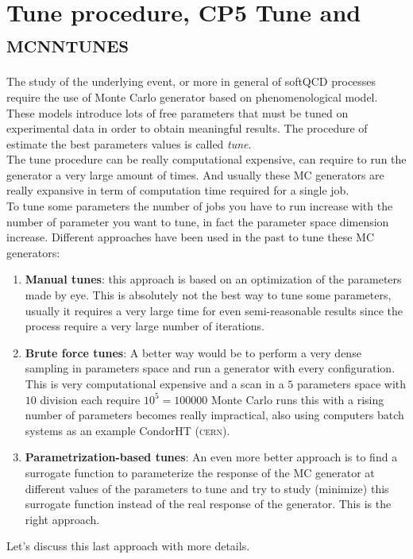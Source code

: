 \chapter{Tune procedure, CP5 Tune and \textsc{mcnntunes}}
\label{chap:TuneprocedureCP5TuneandMCNNTUNES}

The study of the underlying event, or more in general of softQCD processes require the use of Monte Carlo generator based on phenomenological model. These models introduce lots of free parameters that must be tuned on experimental data in order to obtain meaningful results. The procedure of estimate the best parameters values is called \textit{tune}. 
\\
The tune procedure can be really computational expensive,  can require to run the generator a very large amount of times. And usually these MC generators are really expansive in term of computation time required for a single job. 
\\
To tune some parameters the number of jobs you have to run increase with the number of parameter you want to tune, in fact the parameter space dimension increase. Different approaches have been used in the past to tune these MC generators:
\begin{enumerate}[label=\arabic*)]
	\item \textbf{Manual tunes}: this approach is based on an optimization of the parameters made by eye. This is absolutely not the best way to tune some parameters, usually it requires a very large time for even semi-reasonable results since the process require a very large number of iterations.   
	\item \textbf{Brute force tunes}: A better way would be to perform a very dense sampling in parameters space and run a generator with every configuration. This is very computational expensive and a scan in a $5$ parameters space with $10$ division each require $10^5=100000$ Monte Carlo runs this with a rising number of parameters becomes really impractical, also using computers batch systems as an example CondorHT (\textsc{cern}).   
	\item \textbf{Parametrization-based tunes}: An even more better approach is to find a surrogate function to parameterize the response of the MC generator at different values of the parameters to tune and try to study (minimize) this surrogate function instead of the real response of the generator. This is the right approach.
\end{enumerate}
Let's discuss this last approach with more details.

